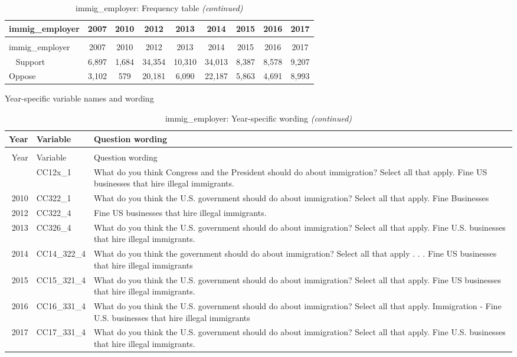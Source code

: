 \documentclass[12pt]{article}
\begin{document}
\begin{longtable}[t]{lcccccccc}
\caption{\label{tab:unnamed-chunk-4}immig\_employer: Frequency table}\\
\toprule
immig\_employer & 2007 & 2010 & 2012 & 2013 & 2014 & 2015 & 2016 & 2017\\
\midrule
\endfirsthead
\caption[]{immig\_employer: Frequency table \textit{(continued)}}\\
\toprule
immig\_employer & 2007 & 2010 & 2012 & 2013 & 2014 & 2015 & 2016 & 2017\\
\midrule
\endhead
\
\endfoot
\bottomrule
\endlastfoot
Support & 6,897 & 1,684 & 34,354 & 10,310 & 34,013 & 8,387 & 8,578 & 9,207\\
Oppose & 3,102 & 579 & 20,181 & 6,090 & 22,187 & 5,863 & 4,691 & 8,993\\*
\end{longtable}

Year-specific variable names and wording

\begin{longtable}[t]{rl>{\raggedright\arraybackslash}p{10cm}}
\caption{\label{tab:unnamed-chunk-4}immig\_employer: Year-specific wording}\\
\toprule
Year & Variable & Question wording\\
\midrule
\endfirsthead
\caption[]{immig\_employer: Year-specific wording \textit{(continued)}}\\
\toprule
Year & Variable & Question wording\\
\midrule
\endhead
\
\endfoot
\bottomrule
\endlastfoot
2007 & CC12x\_1 & What do you think Congress and the President should do about immigration? Select all that apply. Fine US businesses that hire illegal immigrants.\\
2010 & CC322\_1 & What do you think the U.S. government should do about immigration? Select all that apply. Fine Businesses\\
2012 & CC322\_4 & Fine US businesses that hire illegal immigrants.\\
2013 & CC326\_4 & What do you think the U.S. government should do about immigration? Select all that apply. Fine U.S. businesses that hire illegal immigrants.\\
2014 & CC14\_322\_4 & What do you think the government should do about immigration? Select all that apply . . . Fine US businesses that hire illegal immigrants\\
2015 & CC15\_321\_4 & What do you think the U.S. government should do about immigration? Select all that apply. Fine US businesses that hire illegal immigrants.\\
2016 & CC16\_331\_4 & What do you think the U.S. government should do about immigration? Select all that apply. Immigration - Fine U.S. businesses that hire illegal immigrants\\
2017 & CC17\_331\_4 & What do you think the U.S. government should do about immigration? Select all that apply. Fine U.S. businesses that hire illegal immigrants.\\*
\end{longtable}
\end{document}
